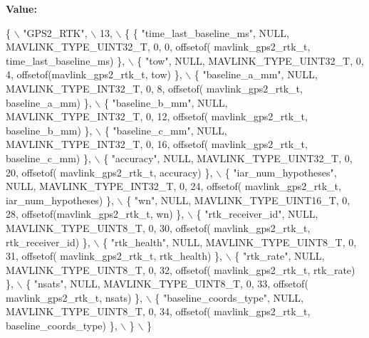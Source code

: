 {\bfseries Value\+:}
\begin{DoxyCode}
\{ \(\backslash\)
    \textcolor{stringliteral}{"GPS2\_RTK"}, \(\backslash\)
    13, \(\backslash\)
    \{  \{ \textcolor{stringliteral}{"time\_last\_baseline\_ms"}, NULL, MAVLINK_TYPE_UINT32_T, 0, 0, offsetof(
      mavlink_gps2_rtk_t, time\_last\_baseline\_ms) \}, \(\backslash\)
         \{ \textcolor{stringliteral}{"tow"}, NULL, MAVLINK_TYPE_UINT32_T, 0, 4, offsetof(mavlink_gps2_rtk_t, tow) \}, \(\backslash\)
         \{ \textcolor{stringliteral}{"baseline\_a\_mm"}, NULL, MAVLINK_TYPE_INT32_T, 0, 8, offsetof(
      mavlink_gps2_rtk_t, baseline\_a\_mm) \}, \(\backslash\)
         \{ \textcolor{stringliteral}{"baseline\_b\_mm"}, NULL, MAVLINK_TYPE_INT32_T, 0, 12, offsetof(
      mavlink_gps2_rtk_t, baseline\_b\_mm) \}, \(\backslash\)
         \{ \textcolor{stringliteral}{"baseline\_c\_mm"}, NULL, MAVLINK_TYPE_INT32_T, 0, 16, offsetof(
      mavlink_gps2_rtk_t, baseline\_c\_mm) \}, \(\backslash\)
         \{ \textcolor{stringliteral}{"accuracy"}, NULL, MAVLINK_TYPE_UINT32_T, 0, 20, offsetof(
      mavlink_gps2_rtk_t, accuracy) \}, \(\backslash\)
         \{ \textcolor{stringliteral}{"iar\_num\_hypotheses"}, NULL, MAVLINK_TYPE_INT32_T, 0, 24, offsetof(
      mavlink_gps2_rtk_t, iar\_num\_hypotheses) \}, \(\backslash\)
         \{ \textcolor{stringliteral}{"wn"}, NULL, MAVLINK_TYPE_UINT16_T, 0, 28, offsetof(mavlink_gps2_rtk_t, wn) \}, \(\backslash\)
         \{ \textcolor{stringliteral}{"rtk\_receiver\_id"}, NULL, MAVLINK_TYPE_UINT8_T, 0, 30, offsetof(
      mavlink_gps2_rtk_t, rtk\_receiver\_id) \}, \(\backslash\)
         \{ \textcolor{stringliteral}{"rtk\_health"}, NULL, MAVLINK_TYPE_UINT8_T, 0, 31, offsetof(
      mavlink_gps2_rtk_t, rtk\_health) \}, \(\backslash\)
         \{ \textcolor{stringliteral}{"rtk\_rate"}, NULL, MAVLINK_TYPE_UINT8_T, 0, 32, offsetof(
      mavlink_gps2_rtk_t, rtk\_rate) \}, \(\backslash\)
         \{ \textcolor{stringliteral}{"nsats"}, NULL, MAVLINK_TYPE_UINT8_T, 0, 33, offsetof(
      mavlink_gps2_rtk_t, nsats) \}, \(\backslash\)
         \{ \textcolor{stringliteral}{"baseline\_coords\_type"}, NULL, MAVLINK_TYPE_UINT8_T, 0, 34, offsetof(
      mavlink_gps2_rtk_t, baseline\_coords\_type) \}, \(\backslash\)
         \} \(\backslash\)
\}
\end{DoxyCode}
\mbox{\label{mavlink__msg__gps2__rtk_8h_ae0b5152eb253145b0a7baea452049545}} 
